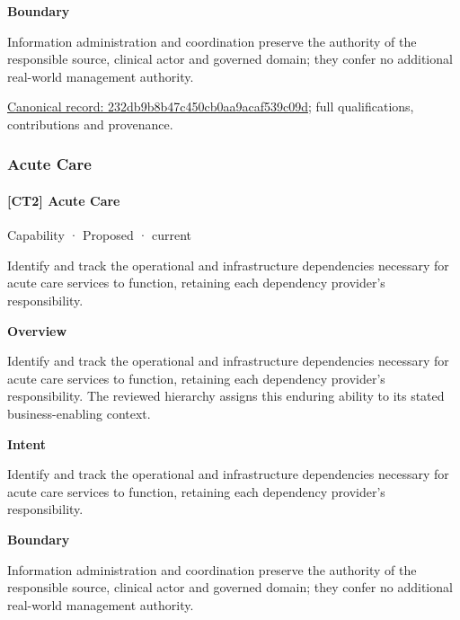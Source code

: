 \textbf{Boundary}



Information administration and coordination preserve the authority of the responsible source, clinical actor and governed domain; they confer no additional real-world management authority.


{\footnotesize \href{../../../../continuum/strategy/capability/232db9b8b47c450cb0aa9acaf539c09d.md}{Canonical record: 232db9b8b47c450cb0aa9acaf539c09d}; full qualifications, contributions and provenance.}\par
\subsubsection{Acute Care}

\paragraph{[CT2] Acute Care}

\label{element:9bb988c526404522b83aeed5069e0eb5}
{\small Capability · Proposed · current}\par

Identify and track the operational and infrastructure dependencies necessary for acute care services to function, retaining each dependency provider's responsibility.



\textbf{Overview}



Identify and track the operational and infrastructure dependencies necessary for acute care services to function, retaining each dependency provider's responsibility. The reviewed hierarchy assigns this enduring ability to its stated business-enabling context.



\textbf{Intent}



Identify and track the operational and infrastructure dependencies necessary for acute care services to function, retaining each dependency provider's responsibility.



\textbf{Boundary}



Information administration and coordination preserve the authority of the responsible source, clinical actor and governed domain; they confer no additional real-world management authority.


